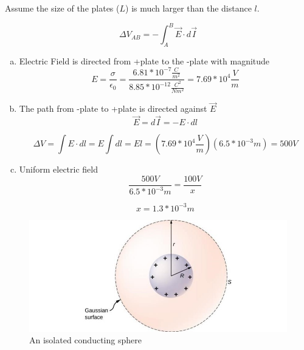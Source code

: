 \documentclass[14pt]{memoir}
\begin{document}
Assume the size of the plates ($L$) is much larger than the distance $l$.

\begin{equation}
\Delta V_{AB} = - \int_A^B \vec{E} \cdot d\vec{I}
\end{equation}

\begin{enumerate}[(a)]
\item Electric Field is directed from +plate to the -plate with magnitude
	\begin{equation}
	E = \frac{\sigma}{\epsilon_0} = \frac{6.81 * 10^{-7} \frac{C}{m^2}}{8.85 * 10^{-12} \frac{C^2}		{N m^2}} = 7.69 * 10^{4} \frac{V}{m}
	\end{equation}
\item The path from -plate to +plate is directed against $\vec{E}$
	\begin{equation}
	\vec{E} = d\vec{I} = -E \cdot dl
	\end{equation}
	
	\begin{equation}
	\Delta V = \int E \cdot dl = E \int dl = El = (7.69 * 10^{4} \frac{V}{m})(6.5 * 10^{-3}m) = 		500V
	\end{equation}
	
\item Uniform electric field 
	\begin{equation}
	\frac{500V}{6.5 * 10^{-3}m} = \frac{100V}{x}
	\end{equation}
	
	\begin{equation}
	x = 1.3 * 10^{-3}m
	\end{equation}
\end{enumerate}

\begin{figure}[H]
\begin{center}
\includegraphics[scale=0.50]{fig/fig_07_38.jpg}
\caption{An isolated conducting sphere}
\label{fig:07_38}
\end{center}
\end{figure}
\end{document}
